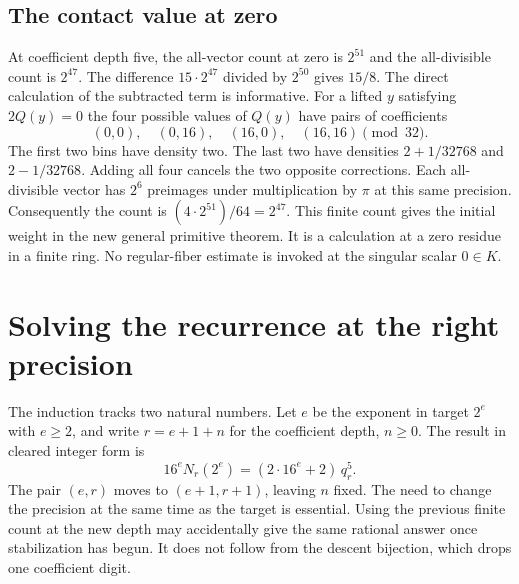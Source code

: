 \documentclass[12pt,letterpaper]{article}
\begin{document}
\subsection{The contact value at zero}
At coefficient depth five, the all-vector count at zero is $2^{51}$ and the all-divisible count is $2^{47}$. The difference $15\cdot2^{47}$ divided by $2^{50}$ gives $15/8$. The direct calculation of the subtracted term is informative. For a lifted $y$ satisfying $2Q(y)=0$ the four possible values of $Q(y)$ have pairs of coefficients
\[
             (0,0),\quad(0,16),\quad(16,0),\quad(16,16)
                   \pmod {32}.
\]
The first two bins have density two. The last two have densities $2+1/32768$ and $2-1/32768$. Adding all four cancels the two opposite corrections. Each all-divisible vector has $2^6$ preimages under multiplication by $\pi$ at this same precision. Consequently the count is $(4\cdot2^{51})/64=2^{47}$. This finite count gives the initial weight in the new general primitive theorem. It is a calculation at a zero residue in a finite ring. No regular-fiber estimate is invoked at the singular scalar $0\in K$.

\section{Solving the recurrence at the right precision}
The induction tracks two natural numbers. Let $e$ be the exponent in target $2^e$ with $e\ge2$, and write $r=e+1+n$ for the coefficient depth, $n\ge0$. The result in cleared integer form is
\[
  16^e N_r(2^e)=(2\cdot16^e+2)\,q_r^5 .
\]
The pair $(e,r)$ moves to $(e+1,r+1)$, leaving $n$ fixed. The need to change the precision at the same time as the target is essential. Using the previous finite count at the new depth may accidentally give the same rational answer once stabilization has begun. It does not follow from the descent bijection, which drops one coefficient digit.
\end{document}
